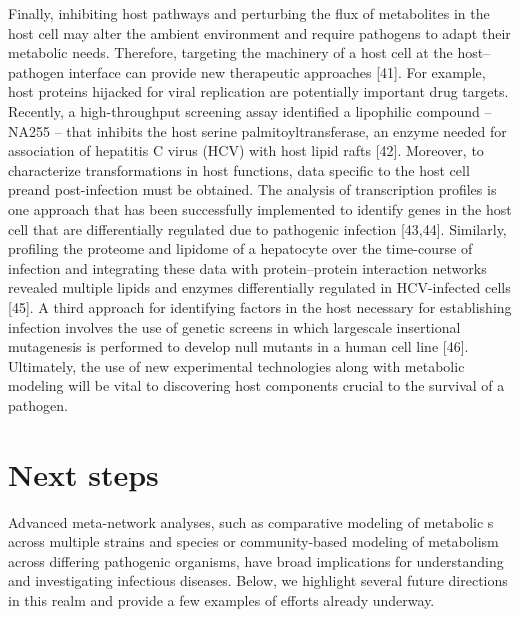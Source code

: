 Finally, inhibiting host pathways and perturbing the \gls{flux} of 
metabolites in the host cell may alter the ambient environment 
and require pathogens to adapt their metabolic needs. Therefore, 
targeting the machinery of a host cell at the host–pathogen 
interface can provide new therapeutic approaches [41]. For 
example, host proteins hijacked for viral replication are 
potentially important drug targets. Recently, a high-throughput 
screening assay identified a lipophilic compound – NA255 – that 
inhibits the host serine palmitoyltransferase, an enzyme 
needed for association of hepatitis C virus (HCV) with host 
lipid rafts [42]. Moreover, to characterize transformations 
in host functions, data specific to the host cell preand 
post-infection must be obtained. The analysis of transcription 
profiles is one approach that has been successfully implemented 
to identify genes in the host cell that are differentially 
regulated due to pathogenic infection [43,44]. Similarly, 
profiling the proteome and lipidome of a hepatocyte over 
the time-course of infection and integrating these data with 
protein–protein interaction networks revealed multiple 
lipids and enzymes differentially regulated in HCV-infected 
cells [45]. A third approach for identifying factors in the 
host necessary for establishing infection involves the use 
of genetic screens in which largescale insertional mutagenesis 
is performed to develop null mutants in a human cell line [46]. 
Ultimately, the use of new experimental technologies along 
with metabolic modeling will be vital to discovering host 
components crucial to the survival of a pathogen.

\section{Next steps}

Advanced meta-network analyses, such as comparative modeling 
of metabolic s across multiple strains and 
species or community-based modeling of metabolism across 
differing pathogenic organisms, have broad implications 
for understanding and investigating infectious diseases. 
Below, we highlight several future directions in this 
realm and provide a few examples of efforts already underway.


